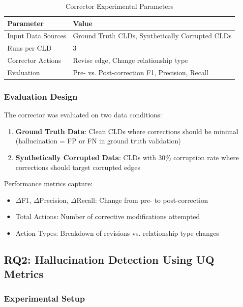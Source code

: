 \documentclass{article}
\begin{document}
\begin{table}[H]
\centering
\caption{Corrector Experimental Parameters}
\label{tab:corrector_params}
\begin{tabular}{ll}
\toprule
\textbf{Parameter} & \textbf{Value} \\
\midrule
Input Data Sources & Ground Truth CLDs, Synthetically Corrupted CLDs \\
Runs per CLD & 3 \\
Corrector Actions & Revise edge, Change relationship type \\
Evaluation & Pre- vs. Post-correction F1, Precision, Recall \\
\bottomrule
\end{tabular}
\end{table}

\subsubsection{Evaluation Design}

The corrector was evaluated on two data conditions:
\begin{enumerate}
    \item \textbf{Ground Truth Data}: Clean CLDs where corrections should be minimal (hallucination = FP or FN in ground truth validation)
    \item \textbf{Synthetically Corrupted Data}: CLDs with 30\% corruption rate where corrections should target corrupted edges
\end{enumerate}

Performance metrics capture:
\begin{itemize}
    \item $\Delta$F1, $\Delta$Precision, $\Delta$Recall: Change from pre- to post-correction
    \item Total Actions: Number of corrective modifications attempted
    \item Action Types: Breakdown of revisions vs. relationship type changes
\end{itemize}

\subsection{RQ2: Hallucination Detection Using UQ Metrics}

\subsubsection{Experimental Setup}
\end{document}
